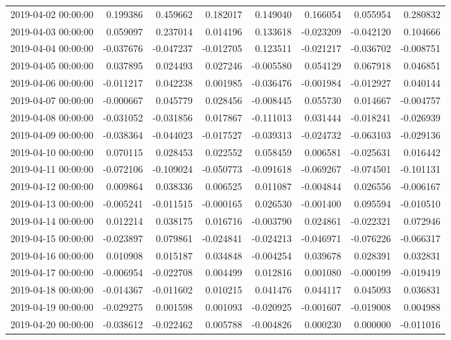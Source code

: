\begin{tabular}{lrrrrrrr}
2019-04-02 00:00:00 & 0.199386 & 0.459662 & 0.182017 & 0.149040 & 0.166054 & 0.055954 & 0.280832 \\
2019-04-03 00:00:00 & 0.059097 & 0.237014 & 0.014196 & 0.133618 & -0.023209 & -0.042120 & 0.104666 \\
2019-04-04 00:00:00 & -0.037676 & -0.047237 & -0.012705 & 0.123511 & -0.021217 & -0.036702 & -0.008751 \\
2019-04-05 00:00:00 & 0.037895 & 0.024493 & 0.027246 & -0.005580 & 0.054129 & 0.067918 & 0.046851 \\
2019-04-06 00:00:00 & -0.011217 & 0.042238 & 0.001985 & -0.036476 & -0.001984 & -0.012927 & 0.040144 \\
2019-04-07 00:00:00 & -0.000667 & 0.045779 & 0.028456 & -0.008445 & 0.055730 & 0.014667 & -0.004757 \\
2019-04-08 00:00:00 & -0.031052 & -0.031856 & 0.017867 & -0.111013 & 0.031444 & -0.018241 & -0.026939 \\
2019-04-09 00:00:00 & -0.038364 & -0.044023 & -0.017527 & -0.039313 & -0.024732 & -0.063103 & -0.029136 \\
2019-04-10 00:00:00 & 0.070115 & 0.028453 & 0.022552 & 0.058459 & 0.006581 & -0.025631 & 0.016442 \\
2019-04-11 00:00:00 & -0.072106 & -0.109024 & -0.050773 & -0.091618 & -0.069267 & -0.074501 & -0.101131 \\
2019-04-12 00:00:00 & 0.009864 & 0.038336 & 0.006525 & 0.011087 & -0.004844 & 0.026556 & -0.006167 \\
2019-04-13 00:00:00 & -0.005241 & -0.011515 & -0.000165 & 0.026530 & -0.001400 & 0.095594 & -0.010510 \\
2019-04-14 00:00:00 & 0.012214 & 0.038175 & 0.016716 & -0.003790 & 0.024861 & -0.022321 & 0.072946 \\
2019-04-15 00:00:00 & -0.023897 & 0.079861 & -0.024841 & -0.024213 & -0.046971 & -0.076226 & -0.066317 \\
2019-04-16 00:00:00 & 0.010908 & 0.015187 & 0.034848 & -0.004254 & 0.039678 & 0.028391 & 0.032831 \\
2019-04-17 00:00:00 & -0.006954 & -0.022708 & 0.004499 & 0.012816 & 0.001080 & -0.000199 & -0.019419 \\
2019-04-18 00:00:00 & -0.014367 & -0.011602 & 0.010215 & 0.041476 & 0.044117 & 0.045093 & 0.036831 \\
2019-04-19 00:00:00 & -0.029275 & 0.001598 & 0.001093 & -0.020925 & -0.001607 & -0.019008 & 0.004988 \\
2019-04-20 00:00:00 & -0.038612 & -0.022462 & 0.005788 & -0.004826 & 0.000230 & 0.000000 & -0.011016 \\

\end{tabular}
